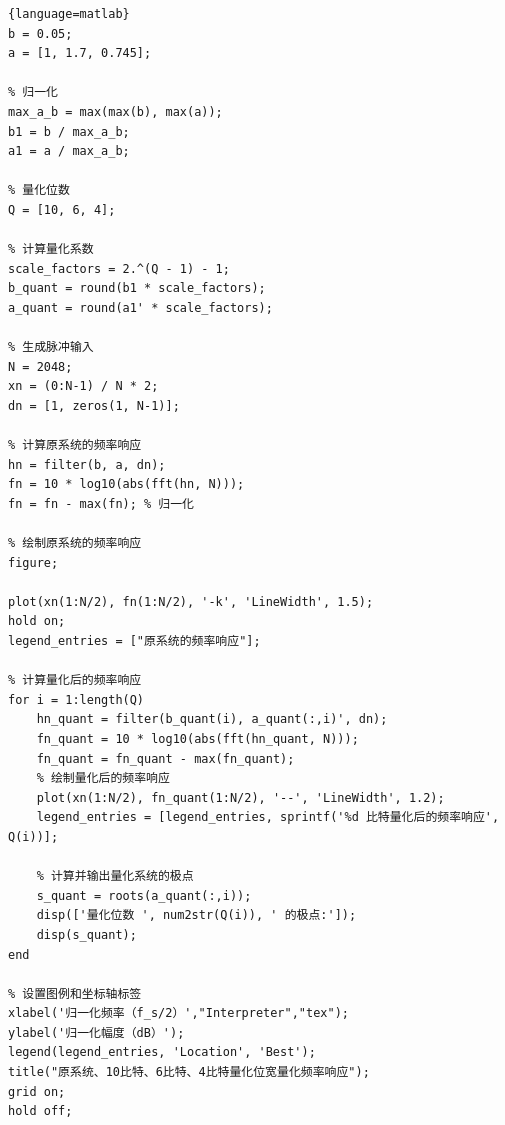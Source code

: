 \documentclass[lang=cn,newtx,10pt,scheme=chinese]{elegantbook}
\begin{document}
\begin{lstlisting}{language=matlab}
b = 0.05;
a = [1, 1.7, 0.745];

% 归一化
max_a_b = max(max(b), max(a));
b1 = b / max_a_b;
a1 = a / max_a_b;

% 量化位数
Q = [10, 6, 4];

% 计算量化系数
scale_factors = 2.^(Q - 1) - 1;
b_quant = round(b1 * scale_factors);
a_quant = round(a1' * scale_factors); 

% 生成脉冲输入
N = 2048;
xn = (0:N-1) / N * 2;
dn = [1, zeros(1, N-1)];

% 计算原系统的频率响应
hn = filter(b, a, dn);
fn = 10 * log10(abs(fft(hn, N)));
fn = fn - max(fn); % 归一化

% 绘制原系统的频率响应
figure;

plot(xn(1:N/2), fn(1:N/2), '-k', 'LineWidth', 1.5);
hold on;
legend_entries = ["原系统的频率响应"];

% 计算量化后的频率响应
for i = 1:length(Q)
    hn_quant = filter(b_quant(i), a_quant(:,i)', dn);
    fn_quant = 10 * log10(abs(fft(hn_quant, N)));
    fn_quant = fn_quant - max(fn_quant);
    % 绘制量化后的频率响应
    plot(xn(1:N/2), fn_quant(1:N/2), '--', 'LineWidth', 1.2);
    legend_entries = [legend_entries, sprintf('%d 比特量化后的频率响应', Q(i))];
    
    % 计算并输出量化系统的极点
    s_quant = roots(a_quant(:,i));
    disp(['量化位数 ', num2str(Q(i)), ' 的极点:']);
    disp(s_quant);
end

% 设置图例和坐标轴标签
xlabel('归一化频率（f_s/2）',"Interpreter","tex");
ylabel('归一化幅度（dB）');
legend(legend_entries, 'Location', 'Best');
title("原系统、10比特、6比特、4比特量化位宽量化频率响应");
grid on;
hold off;

\end{lstlisting}
\end{document}
